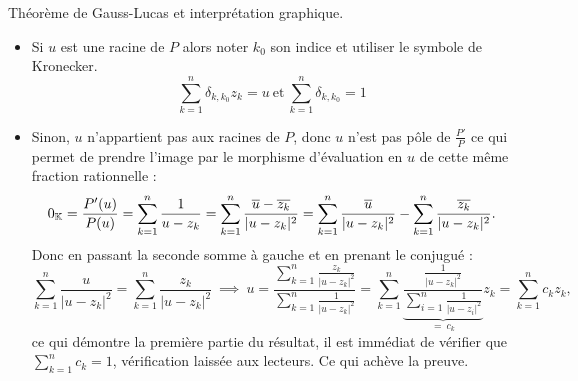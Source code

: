 \documentclass{article}
\renewenvironment{question_kholle}[2][ ]
{
	\subsection{\texorpdfstring{#2}{}}
	\notblank{#1}
	{
		\noindent #1
		\bigbreak
	}
	{}
	\begin{proof}
}
{
	\end{proof}
}
\begin{document}
\begin{question_kholle}
	[Les racines du polynôme dérivée sont dans l'enveloppe convexe des racines du polynôme. \\
		Soit {$P\in \C[X]$} de degré au moins $2$ et notons $z_1, \dots, z_n$ ses racines répétées avec multiplicité. \\
		Soit $u$ une racine de $P'$.
		Alors :
		\begin{equation}
			\exists \ (c_1, \dots, c_n)\in \R ^*_+ \ : \ \sum_{k=1}^n c_k z_k = u \ \text{et} \ \sum_{k=1}^n c_k = 1.
		\end{equation}]
	{Théorème de Gauss-Lucas et interprétation graphique.}
	\begin{itemize}[label=$\star$]
		\item Si $u$ est une racine de $P$ alors noter $k_0$ son indice et utiliser le symbole de Kronecker.
		      $$ \sum_{k=1}^n \delta_{k, k_0} z_k = u \ \text{et} \ \sum_{k=1}^n \delta_{k, k_0} = 1 $$
		\item Sinon, $u$ n'appartient pas aux racines de $P$, donc $u$ n'est pas pôle de $\frac{P'}{P}$ ce qui permet de prendre l'image par le morphisme d'évaluation en $u$ de cette même fraction rationnelle :
		      \[
			      0_{\mathbb K} = \frac{P'(u)}{P(u)} = \sum_{k = 1}^n \frac{1}{u - z_k} = \sum_{k = 1}^n \frac{\overline{u}- \overline{z_k}}{|u-z_k|^2} = \sum_{k = 1}^n \frac{\overline{u}}{|u-z_k|^2}- \sum_{k = 1}^n \frac{\overline{z_k}}{|u-z_k|^2}.
		      \]
		      Donc en passant la seconde somme à gauche et en prenant le conjugué :
		      \[
			      \sum_{k = 1}^n\frac{u}{|u-z_k|^2} = \sum_{k = 1}^n \frac{z_k}{|u-z_k|^2} \ \implies \ u = \frac{\sum_{k = 1}^n \frac{z_k}{|u-z_k|^2}}{\sum_{k = 1}^n\frac{1}{|u-z_k|^2}}= \sum_{k = 1}^n\underset{= \ c_k}{\underbrace{\frac{\frac{1}{|u-z_k|^2}}{\sum_{i = 1}^n\frac{1}{|u-z_i|^2}}}} z_k = \sum_{k=1}^n c_k z_k ,
		      \]
		      ce qui démontre la première partie du résultat, il est immédiat de vérifier que $\sum_{k=1}^nc_k = 1$, vérification laissée aux lecteurs. Ce qui achève la preuve.
	\end{itemize}
	\begin{figure}[H]
		\centering
\end{figure}
\end{question_kholle}
\end{document}
